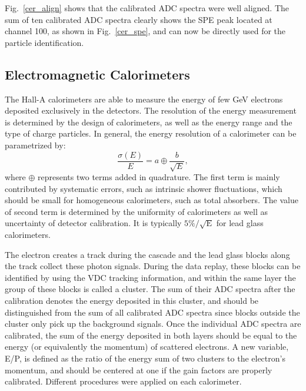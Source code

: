  Fig.~\ref{cer_align} shows that the calibrated ADC spectra were well aligned. The sum of ten calibrated ADC spectra clearly shows the SPE peak located at channel 100, as shown in Fig.~\ref{cer_spe}, and can now be directly used for the particle identification.

\subsection{Electromagnetic Calorimeters}
  The Hall-A calorimeters are able to measure the energy of few GeV electrons deposited exclusively in the detectors. The resolution of the energy measurement is determined by the design of calorimeters, as well as the energy range and the type of charge particles. In general, the energy resolution of a calorimeter can be parametrized by\cite{R_Bock}:
\begin{equation}
  \frac{\sigma(E)}{E} = a \oplus \frac{b}{\sqrt{E}},
\end{equation}
where $\oplus$ represents two terms added in quadrature. The first term is mainly contributed by systematic errors, such as intrinsic shower fluctuations, which should be small for homogeneous calorimeters, such as total absorbers. The value of second term is determined by the uniformity of calorimeters as well as uncertainty of detector calibration. It is typically $\mathrm{5\%/\sqrt{E}}$ for lead glass calorimeters. 

  The electron creates a track during the cascade and the lead glass blocks along the track collect these photon signals. During the data replay, these blocks can be identified by using the VDC tracking information, and within the same layer the group of these blocks is called a cluster. The sum of their ADC spectra after the calibration denotes the energy deposited in this cluster, and should be distinguished from the sum of all calibrated ADC spectra since blocks outside the cluster only pick up the background signals. Once the individual ADC spectra are calibrated, the sum of the energy deposited in both layers should be equal to the energy (or equivalently the momentum) of scattered electrons. A new variable, E/P, is defined as the ratio of the energy sum of two clusters to the electron's momentum, and should be centered at one if the gain factors are properly calibrated. Different procedures were applied on each calorimeter. 
 
